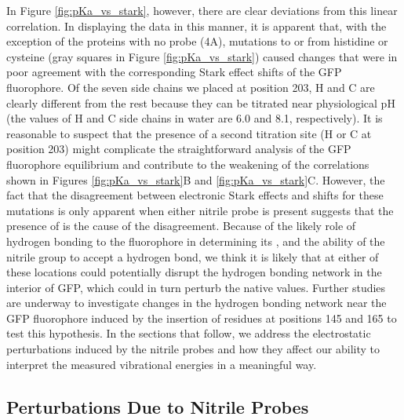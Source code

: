 In Figure \ref{fig:pKa_vs_stark}, however, there are clear deviations from this linear correlation.
In displaying the data in this manner, it is apparent that, with the exception of the proteins with no \pCNF{} probe (4A), mutations to or from histidine or cysteine (gray squares in Figure \ref{fig:pKa_vs_stark}) caused \pKa{} changes that were in poor agreement with the corresponding Stark effect shifts of the GFP fluorophore.
Of the seven side chains we placed at position 203, H and C are clearly different from the rest because they can be titrated near physiological pH (the \pKa{} values of H and C side chains in water are 6.0 and 8.1, respectively).
It is reasonable to suspect that the presence of a second titration site (H or C at position 203) might complicate the straightforward analysis of the GFP fluorophore equilibrium and contribute to the weakening of the correlations shown in Figures \ref{fig:pKa_vs_stark}B and \ref{fig:pKa_vs_stark}C.
However, the fact that the disagreement between electronic Stark effects and \pKa{} shifts for these mutations is only apparent when either nitrile probe is present suggests that the presence of \pCNF{} is the cause of the disagreement.
Because of the likely role of hydrogen bonding to the fluorophore in determining its \pKa{}, and the ability of the nitrile group to accept a hydrogen bond, we think it is likely that \pCNF{} at either of these locations could potentially disrupt the hydrogen bonding network in the interior of GFP, which could in turn perturb the native \pKa{} values.
Further studies are underway to investigate changes in the hydrogen bonding network near the GFP fluorophore induced by the insertion of \pCNF{} residues at positions 145 and 165 to test this hypothesis.
In the sections that follow, we address the electrostatic perturbations induced by the nitrile probes and how they affect our ability to interpret the measured vibrational energies in a meaningful way.

\subsection{\pKa{} Perturbations Due to Nitrile Probes}

